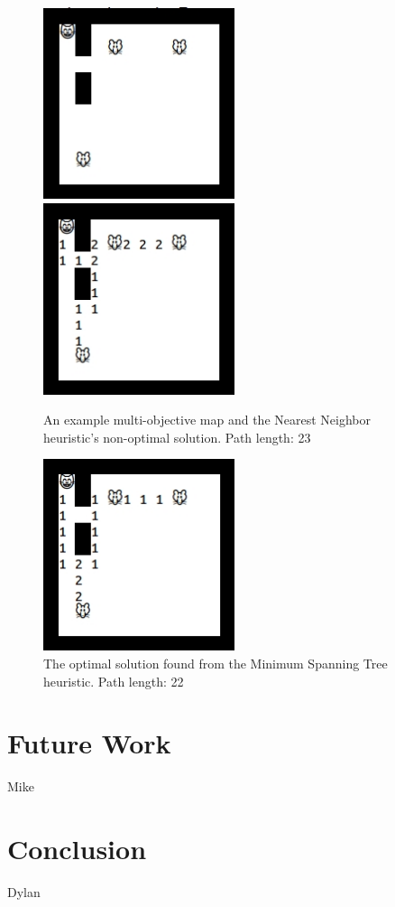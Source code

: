 \documentclass[12pt, conference, compsocconf]{IEEEtran}
\begin{document}
\begin{figure}[ht]
    \centering
    \includegraphics[width=0.5\textwidth]{map_mo.jpg}
    \includegraphics[width=0.5\textwidth]{map_mo_nonopt.jpg}
    \caption{An example multi-objective map and the Nearest Neighbor
heuristic's non-optimal solution.  Path length: 23}
    \label{nonopt}
\end{figure}
\begin{figure}[ht]
    \centering
    \includegraphics[width=0.5\textwidth]{map_mo_opt.jpg}
    \caption{The optimal solution found from the Minimum Spanning Tree
heuristic.  Path length: 22}
    \label{opt}
\end{figure}

\section{Future Work}
Mike

\section{Conclusion}
Dylan



\end{document}
